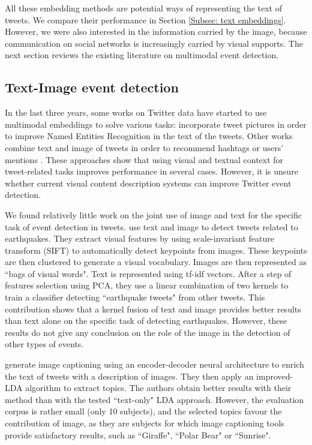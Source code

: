 All these embedding methods are potential ways of representing the text of tweets. We compare their performance in Section \ref{Subsec: text embeddings}. However, we were also interested in the information carried by the image, because communication on social networks is increasingly carried by visual supports. The next section reviews the existing literature on multimodal event detection.

\subsection{Text-Image event detection}

In the last three years, some works on Twitter data have started to use multimodal embeddings to solve various tasks: \citet{lu2018visual} incorporate tweet pictures in order to improve Named Entities Recognition in the text of the tweets. Other works combine text and image of tweets in order to recommend hashtags \citep{zhang2017hashtag} or users' mentions \citep{ma2018mention}. These approaches show that using visual and textual context for tweet-related tasks improves performance in several cases. However, it is unsure whether current visual content description systems can improve Twitter event detection. 


We found relatively little work on the joint use of image and text for the specific task of event detection in tweets. \citet{alqhtani2018multiple} use text and image to detect tweets related to earthquakes. They extract  visual features by using scale-invariant feature transform (SIFT) to
automatically detect keypoints from images. These keypoints are then clustered to generate a visual vocabulary. Images are then represented as ``bags of visual words". Text is represented using tf-idf vectors. After a step of features selection using PCA, they use a linear combination of two kernels to train a classifier detecting ``earthquake tweets" from other tweets. This contribution shows that a kernel fusion of text and image provides better results than text alone on the specific task of detecting earthquakes. However, these results do not give any conclusion on the role of the image in the detection of other types of events.

\citet{zhang2018novel} generate image captioning using an encoder-decoder neural architecture to enrich the text of tweets with a description of images. They then apply an improved-LDA algorithm to extract topics. The authors obtain better results with their method than with the tested ``text-only" LDA approach. However, the evaluation corpus is rather small (only 10 subjects), and the selected topics favour the contribution of image, as they are subjects for which image captioning tools provide satisfactory results, such as ``Giraffe", ``Polar Bear" or ``Sunrise".  


